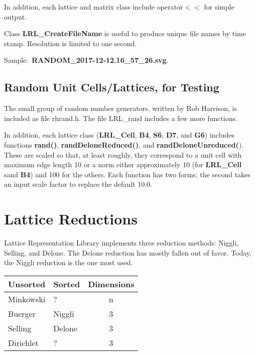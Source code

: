 \documentclass[11pt]{article} %
\begin{document}
In addition, each lattice and matrix class include operator$<<$ for simple output.

Class \textbf{LRL\_CreateFileName} is useful to produce unique file names by time stamp. Resolution is limited to one second.

Sample$\colon$ \mbox{\textbf{RANDOM\_2017-12-12.16\_57\_26.svg}}.

\subsection{Random Unit Cells/Lattices, for Testing}


The small group of random number generators, written by Rob Harrison, is included as file rhrand.h. The file LRL\_rand includes a few more functions.

In addition, each lattice class (\textbf{LRL\_Cell}, \textbf{B4}, \textbf{S6}, \textbf{D7}, and \textbf{G6}) includes functions \textbf{rand()}, \textbf{randDeloneReduced()}, and \textbf{randDeloneUnreduced(}). These are scaled so that, at least roughly, they correspond to a unit cell with maximum edge length 10 or a norm either approximately 10 (for \textbf{LRL\_Cell} sand \textbf{B4}) and 100 for the others. Each function has two forms; the second takes an input scale factor to replace the default 10.0.

\section{Lattice Reductions}

Lattice Representation Library implements three reduction methods: Niggli, Selling, and Delone. The Delone reduction has mostly fallen out of favor. Today, the Niggli reduction is the one most used. 

\begin{center}
\begin{tabular}{|l|l|c|} %
\hline %
Unsorted & Sorted & Dimensions \\
\hline
Minkowski & ? & n \\
Buerger & Niggli & 3 \\
Selling & Delone & 3 \\
Dirichlet & ? & 3 \\
\hline
\end{tabular}
\end{center}
\end{document}
